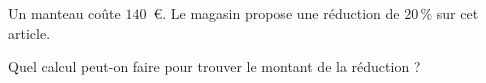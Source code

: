 
Un manteau coûte $140$~€. Le magasin propose une réduction de $20\,\%$ sur cet article.

Quel calcul peut-on faire pour trouver le montant de la réduction ?

\smallskip

